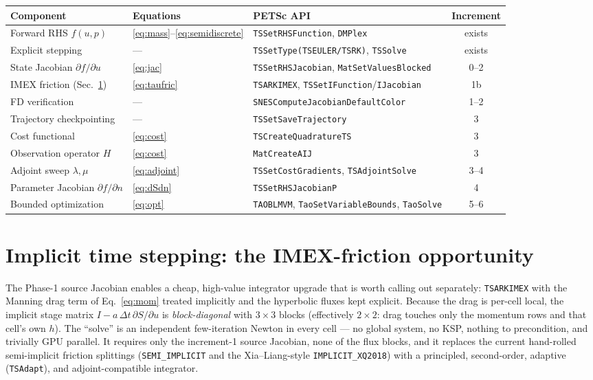 \documentclass[11pt]{article}
\begin{document}
\begin{center}
\begin{tabular}{@{}lllc@{}}
\toprule
Component & Equations & PETSc API & Increment \\
\midrule
Forward RHS $f(u,p)$ & \eqref{eq:mass}--\eqref{eq:semidiscrete} &
  \texttt{TSSetRHSFunction}, \texttt{DMPlex} & exists \\
Explicit stepping & --- & \texttt{TSSetType(TSEULER/TSRK)}, \texttt{TSSolve} & exists \\
State Jacobian $\partial f/\partial u$ & \eqref{eq:jac} &
  \texttt{TSSetRHSJacobian}, \texttt{MatSetValuesBlocked} & 0--2 \\
IMEX friction (Sec.~\ref{sec:imex}) & \eqref{eq:taufric} &
  \texttt{TSARKIMEX}, \texttt{TSSetIFunction}/\texttt{IJacobian} & 1b \\
FD verification & --- & \texttt{SNESComputeJacobianDefaultColor} & 1--2 \\
Trajectory checkpointing & --- & \texttt{TSSetSaveTrajectory} & 3 \\
Cost functional & \eqref{eq:cost} & \texttt{TSCreateQuadratureTS} & 3 \\
Observation operator $H$ & \eqref{eq:cost} & \texttt{MatCreateAIJ} & 3 \\
Adjoint sweep $\lambda,\mu$ & \eqref{eq:adjoint} &
  \texttt{TSSetCostGradients}, \texttt{TSAdjointSolve} & 3--4 \\
Parameter Jacobian $\partial f/\partial n$ & \eqref{eq:dSdn} &
  \texttt{TSSetRHSJacobianP} & 4 \\
Bounded optimization & \eqref{eq:opt} &
  \texttt{TAOBLMVM}, \texttt{TaoSetVariableBounds}, \texttt{TaoSolve} & 5--6 \\
\bottomrule
\end{tabular}
\end{center}

\section{Implicit time stepping: the IMEX-friction opportunity}
\label{sec:imex}

The Phase-1 source Jacobian enables a cheap, high-value integrator
upgrade that is worth calling out separately: \texttt{TSARKIMEX} with
the Manning drag term of Eq.~\eqref{eq:mom} treated implicitly and the
hyperbolic fluxes kept explicit. Because the drag is per-cell local, the
implicit stage matrix $I - a\,\Delta t\,\partial S/\partial u$ is
\emph{block-diagonal} with $3\times3$ blocks (effectively $2\times2$:
drag touches only the momentum rows and that cell's own $h$). The
``solve'' is an independent few-iteration Newton in every cell --- no
global system, no KSP, nothing to precondition, and trivially GPU
parallel. It requires only the increment-1 source Jacobian, none of the
flux blocks, and it replaces the current hand-rolled semi-implicit
friction splittings (\texttt{SEMI\_IMPLICIT} and the Xia--Liang-style
\texttt{IMPLICIT\_XQ2018}) with a principled, second-order, adaptive
(\texttt{TSAdapt}), and adjoint-compatible integrator.
\end{document}
